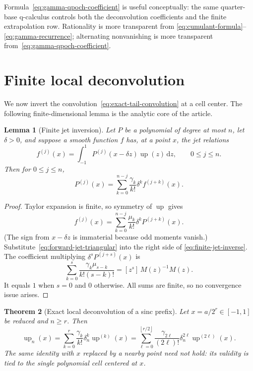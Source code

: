 \documentclass[11pt,a4paper]{article}
\newtheorem{theorem}{Theorem}[section]
\newtheorem{lemma}[theorem]{Lemma}
\theoremstyle{remark}
\newcommand{\dd}{\,\mathrm{d}}
\newcommand{\up}{\operatorname{up}}
\newcommand{\coeff}[2]{[z^{#1}]\,#2}
\newcommand{\floor}[1]{\left\lfloor #1\right\rfloor}
\begin{document}
Formula~\eqref{eq:gamma-qpoch-coefficient} is useful conceptually: the same
quarter-base q-calculus controls both the deconvolution coefficients and the
finite extrapolation row.  Rationality is more transparent from
\eqref{eq:cumulant-formula}--\eqref{eq:gamma-recurrence}; alternating
nonvanishing is more transparent from~\eqref{eq:gamma-qpoch-coefficient}.

\section{Finite local deconvolution}
\label{sec:deconvolution}

We now invert the convolution~\eqref{eq:exact-tail-convolution} at a cell
center.  The following finite-dimensional lemma is the analytic core of the
article.

\begin{lemma}[Finite jet inversion]
\label{lem:finite-jet-inversion}
Let $P$ be a polynomial of degree at most $n$, let $\delta>0$, and suppose a
smooth function $f$ has, at a point $x$, the jet relations
\begin{equation}
 f^{(j)}(x)=\int_{-1}^{1}P^{(j)}(x-\delta z)\up(z)\dd z,
 \qquad 0\le j\le n.
 \label{eq:jet-convolution-relation}
\end{equation}
Then for $0\le j\le n$,
\begin{equation}
 \boxed{
 P^{(j)}(x)=\sum_{k=0}^{n-j}
 \frac{\gamma_k}{k!}\delta^k f^{(j+k)}(x). }
 \label{eq:finite-jet-inverse}
\end{equation}
\end{lemma}

\begin{proof}
Taylor expansion is finite, so symmetry of $\up$ gives
\begin{equation}
 f^{(j)}(x)=\sum_{k=0}^{n-j}
 \frac{\mu_k}{k!}\delta^kP^{(j+k)}(x).
 \label{eq:forward-jet-triangular}
\end{equation}
(The sign from $x-\delta z$ is immaterial because odd moments vanish.)
Substitute~\eqref{eq:forward-jet-triangular} into the right side of
\eqref{eq:finite-jet-inverse}.  The coefficient multiplying
$\delta^sP^{(j+s)}(x)$ is
\[
 \sum_{k=0}^{s}\frac{\gamma_k\mu_{s-k}}{k!(s-k)!}
 =\coeff{s}{M(z)^{-1}M(z)}.
\]
It equals $1$ when $s=0$ and $0$ otherwise.  All sums are finite, so no
convergence issue arises.
\end{proof}

\begin{theorem}[Exact local deconvolution of a sinc prefix]
\label{thm:exact-local-deconvolution}
Let $x=a/2^r\in[-1,1]$ be reduced and $n\ge r$.  Then
\begin{equation}
 \boxed{
 \up_n(x)=\sum_{k=0}^{r}
 \frac{\gamma_k}{k!}\delta_n^k\up^{(k)}(x)
 =\sum_{\ell=0}^{\floor{r/2}}
 \frac{\gamma_{2\ell}}{(2\ell)!}
 \delta_n^{2\ell}\up^{(2\ell)}(x). }
 \label{eq:exact-local-deconv}
\end{equation}
The same identity with $x$ replaced by a nearby point need not hold: its
validity is tied to the single polynomial cell centered at $x$.
\end{theorem}
\end{document}
